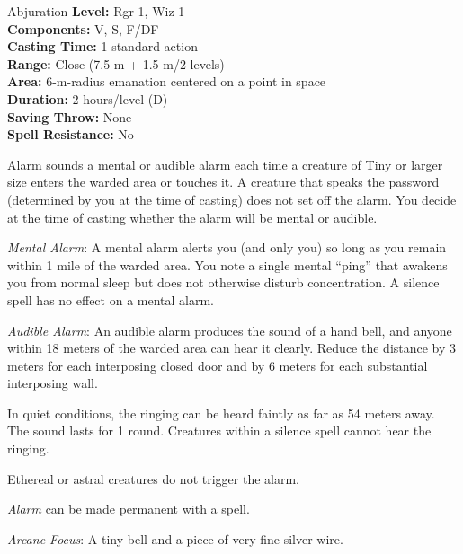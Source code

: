 {Abjuration}
{
	\textbf{Level:}
	Rgr 1, Wiz 1\\
	\textbf{Components:}
	V, S, F/DF\\
	\textbf{Casting Time:}
	1 standard action\\
	\textbf{Range:}
	Close (7.5 m + 1.5 m/2 levels)\\
	\textbf{Area:}
	6-m-radius emanation centered on a point in space\\
	\textbf{Duration:}
	2 hours/level (D)\\
	\textbf{Saving Throw:}
	None\\
	\textbf{Spell Resistance:}
	No\\
}
{
	Alarm sounds a mental or audible alarm each time a creature of Tiny or larger size enters the warded area or touches it. A creature that speaks the password (determined by you at the time of casting) does not set off the alarm. You decide at the time of casting whether the alarm will be mental or audible.

	\textit{Mental Alarm}:
	A mental alarm alerts you (and only you) so long as you remain within 1 mile of the warded area. You note a single mental ``ping'' that awakens you from normal sleep but does not otherwise disturb concentration. A silence spell has no effect on a mental alarm.

	\textit{Audible Alarm}:
	An audible alarm produces the sound of a hand bell, and anyone within 18 meters of the warded area can hear it clearly. Reduce the distance by 3 meters for each interposing closed door and by 6 meters for each substantial interposing wall.

	In quiet conditions, the ringing can be heard faintly as far as 54 meters away. The sound lasts for 1 round. Creatures within a silence spell cannot hear the ringing.

	Ethereal or astral creatures do not trigger the alarm.

	\emph{Alarm} can be made permanent with a  spell.

	\textit{Arcane Focus}:
	A tiny bell and a piece of very fine silver wire.

}

